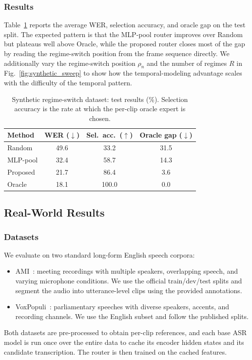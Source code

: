 \documentclass[journal]{IEEEtran}
\begin{document}
\subsubsection{Results}

Table~\ref{tab:synthetic} reports the average WER, selection
accuracy, and oracle gap on the test split.
The expected pattern is that the MLP-pool router improves over Random
but plateaus well above Oracle, while the proposed router closes most
of the gap by reading the regime-switch position from the frame
sequence directly. We additionally vary the regime-switch position
$\rho_n$ and the number of regimes $R$ in
Fig.~\ref{fig:synthetic_sweep} to show how the temporal-modeling
advantage scales with the difficulty of the temporal pattern.

\begin{table}[t]
\centering
\caption{Synthetic regime-switch dataset: test results (\%).
Selection accuracy is the rate at which the per-clip oracle expert is
chosen.}
\label{tab:synthetic}
\small
\begin{tabular}{lccc}
\toprule
Method & WER ($\downarrow$) & Sel.\ acc.\ ($\uparrow$) & Oracle gap ($\downarrow$) \\
\midrule
Random            & 49.6 & 33.2 & 31.5 \\
MLP-pool          & 32.4 & 58.7 & 14.3 \\
Proposed          & 21.7 & 86.4 &  3.6 \\
\midrule
Oracle            & 18.1 & 100.0 & 0.0 \\
\bottomrule
\end{tabular}
\end{table}

\subsection{Real-World Results}
\label{subsec:real}

\subsubsection{Datasets}

We evaluate on two standard long-form English speech corpora:
\begin{itemize}
    \item AMI~\cite{carletta2005ami}: meeting recordings with multiple
    speakers, overlapping speech, and varying microphone conditions.
    We use the official train/dev/test splits and segment the audio
    into utterance-level clips using the provided annotations.
    \item VoxPopuli~\cite{wang2021voxpopuli}: parliamentary speeches
    with diverse speakers, accents, and recording channels. We use
    the English subset and follow the published splits.
\end{itemize}
Both datasets are pre-processed to obtain per-clip references, and
each base ASR model is run once over the entire data to cache its
encoder hidden states and its candidate transcription. The router is
then trained on the cached features.
\end{document}
